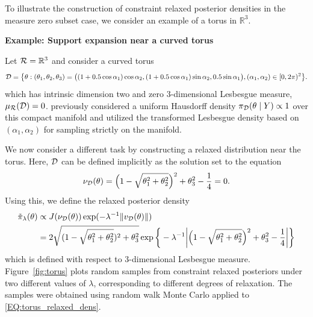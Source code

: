 \documentclass[10pt,fleqn]{article}
\newcommand{\aki}[1]{{\color{green}{#1}}}
\DeclareMathOperator{\1}{\mathbbm{1}} \DeclareMathOperator{\bigO}{\mc O}
\begin{document}
To illustrate the construction of constraint relaxed posterior densities in the measure zero subset case, we consider an example of a torus in $\mathbb{R}^3.$

{\noindent \textbf{Example: Support expansion near a curved torus}}

Let $\mathcal{R} = \mathbb{R}^3$ and consider a curved torus
$$\mathcal{D}= \big\{\theta: (\theta_1,\theta_2,\theta_3) = \big(
(1+ 0.5 \cos\alpha_1) \cos\alpha_2, (1+ 0.5\cos\alpha_1) \sin\alpha_2,0.5 \sin\alpha_1\big), (\alpha_1,\alpha_2)\in [0,2\pi)^2 \big\}.$$ 
which has intrinsic dimension two and zero
$3$-dimensional Lesbesgue measure, $\mu_{\mathcal{R}}(\mathcal{D})=0$. \cite{diaconis2013manifold} previously considered a uniform Hausdorff density $\pi_{\mathcal{D} }(\theta \mid Y) \propto 1$ over this compact manifold and utilized the transformed Lesbesgue density based on $(\alpha_1,\alpha_2)$ for sampling strictly on the manifold.

We now consider a different task by constructing a relaxed distribution near the torus. Here, $\mathcal{D}$ can be defined implicitly as the solution set to the equation
$$\nu_{\mathcal{D}}(\theta) = \Big(1-\sqrt{\theta_1^2+\theta_2^2}\Big)^2 + \theta_3^2 - \frac{1}{4} = 0.$$ 
Using this, we define the relaxed posterior density
\begin{equation}
\begin{aligned}
\tilde\pi_{\lambda}(\theta)& \propto J(\nu_{\mathcal{D}}(\theta)) \exp(-\lambda^{-1}\|v_{\mathcal{D}}(\theta)\|)\\
& = 2\sqrt{(1-\sqrt{\theta_1^2+\theta_2^2})^2 + \theta_3^2 }\exp\bigg\{-\lambda^{-1}\bigg| \Big(1-\sqrt{\theta_1^2+\theta_2^2}\Big)^2 + \theta_3^2 - \frac{1}{4} \bigg| \bigg\}
\end{aligned}
\label{EQ:torus_relaxed_dens}
\end{equation}
which is defined with respect to $3$-dimensional Lesbesgue measure. \aki{Here we are throwing the Jacobian term on the relaxed distribution (which is absolutely necessary for uniform sampling) but this is inconsistent with our presentation of the relaxed density without Jacobian.} Figure~\ref{fig:torus} plots random samples from constraint relaxed posteriors under two different values of $\lambda$, corresponding to different degrees of relaxation. The samples were obtained using random walk Monte Carlo applied to \eqref{EQ:torus_relaxed_dens}.
\end{document}
